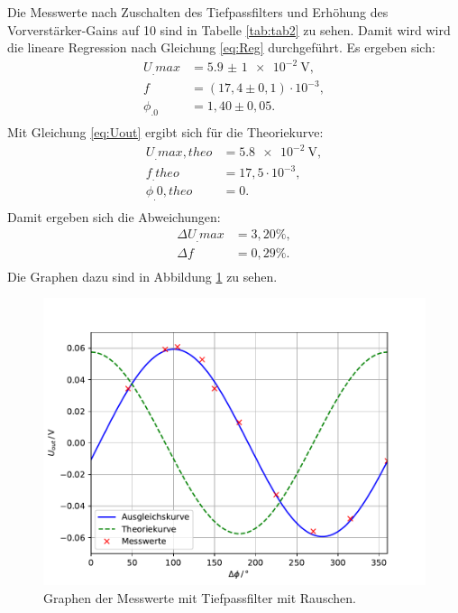 \noindent Die Messwerte nach Zuschalten des Tiefpassfilters und Erhöhung des Vorverstärker-Gains auf 10 sind in Tabelle \ref{tab:tab2} zu sehen. Damit wird wird die lineare Regression nach Gleichung \eqref{eq:Reg} durchgeführt.
Es ergeben sich:
\begin{align*}
U_.{max} &= \SI{5,9(1)e-2}{\volt} ,\\
f 		 &= (17,4\pm0,1)\cdot 10^{-3} ,\\
\phi_.0  &= 1,40\pm0,05 \text{.}\\
\end{align*}
Mit Gleichung \eqref{eq:Uout} ergibt sich für die Theoriekurve:
\begin{align*}
U_.{max,theo} &= \SI{5,8e-2}{\volt} ,\\
f_.{theo}	  &= 17,5\cdot 10^{-3} ,\\
\phi_.{0,theo}&= 0 \text{.}\\
\end{align*}
Damit ergeben sich die Abweichungen:
\begin{align*}
\Delta U_.{max} &= 3,20\% ,\\
\Delta f		&= 0,29\% \text{.}\\
\end{align*}
Die Graphen dazu sind in Abbildung \ref{fig:U4} zu sehen.

\begin{figure}
\centering
\includegraphics[width=\linewidth-75pt,height=\textheight-75pt,keepaspectratio]{content/images/plot2.pdf}
\caption{Graphen der Messwerte mit Tiefpassfilter mit Rauschen.}\label{fig:U4}
\end{figure}


